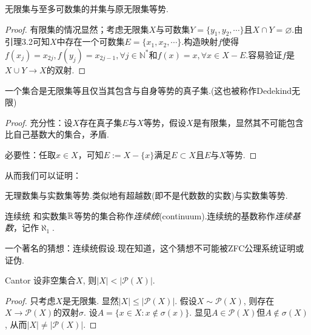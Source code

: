 \begin{theorem}
	无限集与至多可数集的并集与原无限集等势.
\end{theorem}
\begin{proof}
	有限集的情况显然；考虑无限集$X$与可数集$Y=\{ y_1,y_2,\cdots \}$且$X \cap Y = \varnothing$.由引理3.2可知$X$中存在一个可数集$E=\{ x_1,x_2,\cdots \}$.构造映射$f$使得$f(x_j)=x_{2j},f(y_j)=x_{2j-1}, \forall j \in \mathbb{N}^*$和$f(x)=x,\forall x \in X-E$.容易验证$f$是$X \cup Y \to X$的双射.
\end{proof}

\begin{theorem}
	一个集合是无限集等且仅当其包含与自身等势的真子集.(这也被称作Dedekind无限)
\end{theorem}
\begin{proof}
	充分性：设$X$存在真子集$E$与$X$等势，假设$X$是有限集，显然其不可能包含比自己基数大的集合，矛盾.
	
	必要性：任取$x \in X$，可知$E:=X-\{x\}$满足$E \subset X$且$E$与$X$等势.
\end{proof}

从而我们可以证明：

\begin{proposition}
	无理数集与实数集等势.类似地有超越数(即不是代数数的实数)与实数集等势.
\end{proposition}

\begin{definition}{连续统}
	和实数集$\mathbb{R}$等势的集合称作\textit{连续统}(continuum).连续统的基数称作\textit{连续基数}，记作$\aleph _1$.
\end{definition}

一个著名的猜想：连续统假设.现在知道，这个猜想不可能被ZFC公理系统证明或证伪.

\begin{theorem}{Cantor}
	设非空集合$X$, 则$|X|<|\mathcal{P}(X)|$.
\end{theorem}
\begin{proof}
	只考虑$X$是无限集. 显然$|X| \leq |\mathcal{P}(X)|$. 假设$X \sim \mathcal{P}(X)$, 则存在$X \to \mathcal{P}(X)$的双射$\sigma$. 设$A=\{ x \in X:x \notin \sigma (x) \}$. 显见$A \in \mathcal{P}(X)$但$A \notin \sigma (X)$, 从而$|X| \neq |\mathcal{P}(X)|$. 
\end{proof}






